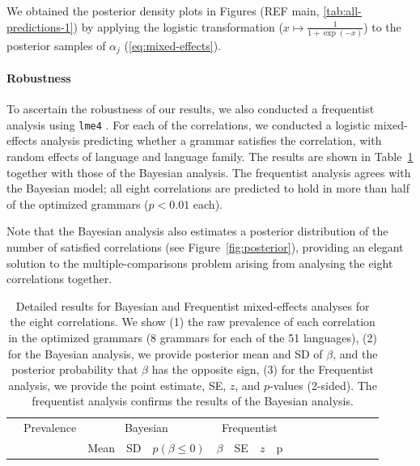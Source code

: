\documentclass[10pt,twoside,lineno]{article}
\begin{document}
We obtained the posterior density plots in Figures (REF main, \ref{tab:all-predictions-1}) by applying the logistic transformation ($x \mapsto \frac{1}{1+\exp(-x)}$) to the posterior samples of $\alpha_j$ (\ref{eq:mixed-effects}).





\paragraph{Robustness}
To ascertain the robustness of our results, we also conducted a frequentist analysis using \texttt{lme4} \cite{bates2015fitting}.
For each of the correlations, we conducted a logistic mixed-effects analysis predicting whether a grammar satisfies the correlation, with random effects of language and language family.
The results are shown in Table~\ref{tab:corr-regression} together with those of the Bayesian analysis.
The frequentist analysis agrees with the Bayesian model; all eight correlations are predicted to hold in more than half of the optimized grammars ($p < 0.01$ each).

Note that the Bayesian analysis  also estimates a posterior distribution of the number of satisfied correlations (see Figure~\ref{fig:posterior}), providing an elegant solution to the multiple-comparisons problem arising from analysing the eight correlations together.





\begin{table}
\small{
\begin{center}
\begin{tabular}{l||l|lll|llll|ll|llllll}
 & Prevalence & \multicolumn{3}{c|}{Bayesian} & \multicolumn{4}{c|}{Frequentist} \\ 
& & Mean & SD & $p(\beta \leq 0)$ & $\beta$ & SE & $z$ & p \\
\hline\hline
	
\end{tabular}
\end{center}
}
	\caption{Detailed results for Bayesian and Frequentist mixed-effects analyses for the eight correlations. 
We show (1) the raw prevalence of each correlation in the optimized grammars (8 grammars for each of the 51 languages),
(2) for the Bayesian analysis, we provide posterior mean and SD of $\beta$, and the posterior probability that $\beta$ has the opposite sign,
(3) for the Frequentist analysis, we provide the point estimate, SE, $z$, and $p$-values (2-sided).
The frequentist analysis confirms the results of the Bayesian analysis.
}\label{tab:corr-regression}
\end{table}
\end{document}
